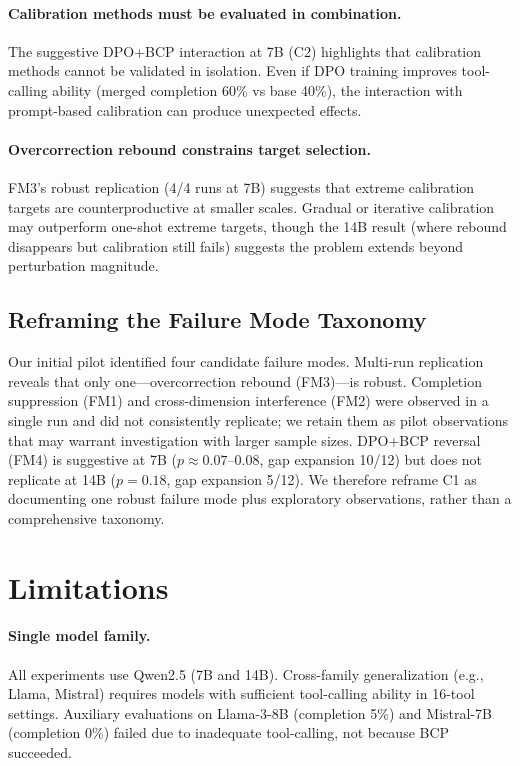 \documentclass[11pt]{article}
\begin{document}
\paragraph{Calibration methods must be evaluated in combination.}
The suggestive DPO+BCP interaction at 7B (C2) highlights that calibration methods cannot be validated in isolation.
Even if DPO training improves tool-calling ability (merged completion 60\% vs base 40\%), the interaction with prompt-based calibration can produce unexpected effects.

\paragraph{Overcorrection rebound constrains target selection.}
FM3's robust replication (4/4 runs at 7B) suggests that extreme calibration targets are counterproductive at smaller scales.
Gradual or iterative calibration may outperform one-shot extreme targets, though the 14B result (where rebound disappears but calibration still fails) suggests the problem extends beyond perturbation magnitude.

\subsection{Reframing the Failure Mode Taxonomy}

Our initial pilot identified four candidate failure modes.
Multi-run replication reveals that only one---overcorrection rebound (FM3)---is robust.
Completion suppression (FM1) and cross-dimension interference (FM2) were observed in a single run and did not consistently replicate; we retain them as pilot observations that may warrant investigation with larger sample sizes.
DPO+BCP reversal (FM4) is suggestive at 7B ($p \approx 0.07$--$0.08$, gap expansion 10/12) but does not replicate at 14B ($p = 0.18$, gap expansion 5/12).
We therefore reframe C1 as documenting one robust failure mode plus exploratory observations, rather than a comprehensive taxonomy.

\section{Limitations}
\label{sec:limitations}

\paragraph{Single model family.}
All experiments use Qwen2.5 (7B and 14B).
Cross-family generalization (e.g., Llama, Mistral) requires models with sufficient tool-calling ability in 16-tool settings.
Auxiliary evaluations on Llama-3-8B (completion 5\%) and Mistral-7B (completion 0\%) failed due to inadequate tool-calling, not because BCP succeeded.
\end{document}
